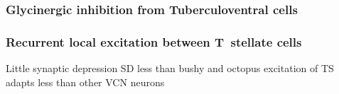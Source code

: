 \subsubsection{Glycinergic inhibition from Tuberculoventral cells}



\subsubsection{Recurrent local excitation between T~stellate cells}

 Little synaptic depression
 SD less than bushy and octopus \citep{WuOertel:1987,ChandaXu-Friedman:2010,CaoOertel:2010}
 excitation of TS adapts less than other VCN neurons




